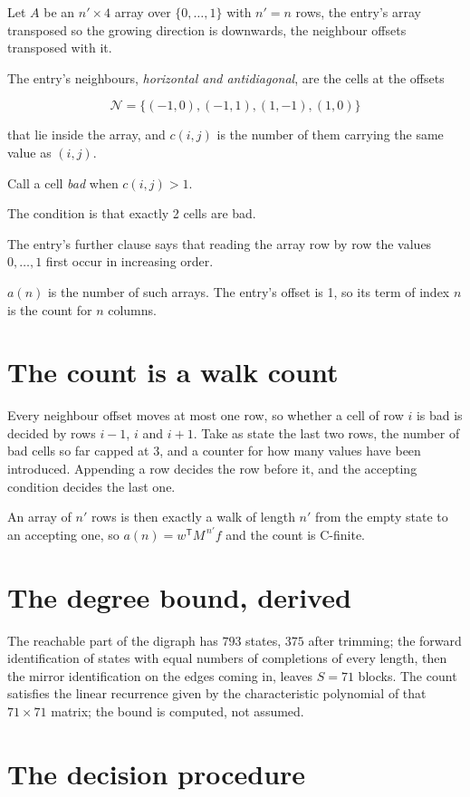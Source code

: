 \documentclass[11pt]{article}
\theoremstyle{definition}
\begin{document}
Let $A$ be an $n' \times 4$ array over $\{0,\dots,1\}$ with $n' = n$ rows, the entry's array transposed so the growing direction is downwards, the neighbour offsets transposed with it.

The entry's neighbours, {\itshape horizontal and antidiagonal}, are the cells at the offsets

\[\mathcal{N} = \{(-1,0), (-1,1), (1,-1), (1,0)\}\]

that lie inside the array, and $c(i,j)$ is the number of them carrying the same value as $(i,j)$.

Call a cell {\itshape bad} when $c(i,j) > 1$.

The condition is that exactly 2 cells are bad.

The entry's further clause says that reading the array row by row the values $0,\dots,1$ first occur in increasing order.

$a(n)$ is the number of such arrays. The entry's offset is 1, so its term of index $n$ is the count for $n$ columns.

\section{The count is a walk count}

Every neighbour offset moves at most one row, so whether a cell of row $i$ is bad is decided by rows $i-1$, $i$ and $i+1$. Take as state the last two rows, the number of bad cells so far capped at 3, and a counter for how many values have been introduced. Appending a row decides the row before it, and the accepting condition decides the last one.

An array of $n'$ rows is then exactly a walk of length $n'$ from the empty state to an accepting one, so $a(n) = w^{\mathsf T}M^{\,n'}f$ and the count is C-finite.

\section{The degree bound, derived}

The reachable part of the digraph has $793$ states, $375$ after trimming; the forward identification of states with equal numbers of completions of every length, then the mirror identification on the edges coming in, leaves $S = 71$ blocks. The count satisfies the linear recurrence given by the characteristic polynomial of that $71\times71$ matrix; the bound is computed, not assumed.

\section{The decision procedure}
\end{document}
